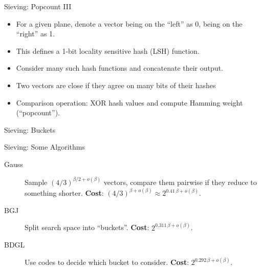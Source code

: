 \documentclass[xcolor=table,10pt,aspectratio=169]{beamer}
\begin{document}
\begin{frame}[label={sec:orga23568b}]{Sieving: Popcount III}
\begin{itemize}
\item For a given plane, denote a vector being on the “left” as 0, being on the “right” as 1.
\item This defines a 1-bit locality sensitive hash (LSH) function.
\item Consider many such hash functions and concatenate their output.
\item Two vectors are close if they agree on many bits of their hashes
\item Comparison operation: XOR hash values and compute Hamming weight (“popcount”).
\end{itemize}
\end{frame}

\begin{frame}[label={sec:org89a976a}]{Sieving: Buckets}
\tikzset{external/export=true}
\centering
{}
\tikzset{external/export=false}
\end{frame}

\begin{frame}[label={sec:orgd96f312}]{Sieving: Some Algorithms}
\begin{description}
\item[{Gauss}] Sample \((4/3)^{\beta/2 + o(\beta)}\) vectors, compare them pairwise if they reduce to something shorter. \textbf{Cost}: \((4/3)^{\beta + o(\beta)} \approx 2^{0.41\,\beta + o(\beta)}\).
\item[{BGJ}] Split search space into “buckets”. \textbf{Cost}: \(2^{0.311\,\beta + o(\beta)}\).
\item[{BDGL}] Use codes to decide which bucket to consider. \textbf{Cost}: \(2^{0.292\,\beta + o(\beta)}\). 
\end{description}
\end{frame}
\end{document}
